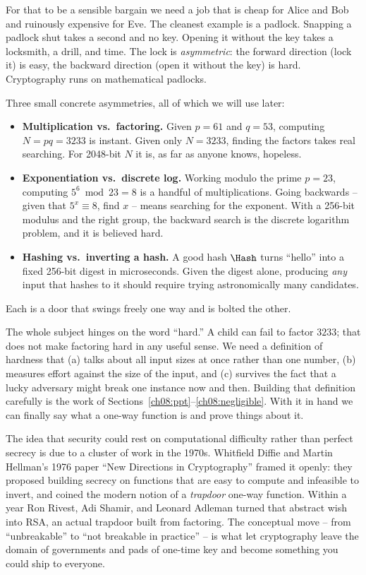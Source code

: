 For that to be a sensible bargain we need a job that is cheap for Alice and Bob and ruinously expensive for Eve. The cleanest example is a padlock. Snapping a padlock shut takes a second and no key. Opening it without the key takes a locksmith, a drill, and time. The lock is \emph{asymmetric}: the forward direction (lock it) is easy, the backward direction (open it without the key) is hard. Cryptography runs on mathematical padlocks.

\begin{intuitionbox}
Three small concrete asymmetries, all of which we will use later:
\begin{itemize}
\item \textbf{Multiplication vs.\ factoring.} Given $p=61$ and $q=53$, computing $N = pq = 3233$ is instant. Given only $N=3233$, finding the factors takes real searching. For 2048-bit $N$ it is, as far as anyone knows, hopeless.
\item \textbf{Exponentiation vs.\ discrete log.} Working modulo the prime $p=23$, computing $5^{6} \bmod 23 = 8$ is a handful of multiplications. Going backwards -- given that $5^{x}\equiv 8$, find $x$ -- means searching for the exponent. With a 256-bit modulus and the right group, the backward search is the discrete logarithm problem, and it is believed hard.
\item \textbf{Hashing vs.\ inverting a hash.} A good hash $\Hash$ turns ``hello'' into a fixed 256-bit digest in microseconds. Given the digest alone, producing \emph{any} input that hashes to it should require trying astronomically many candidates.
\end{itemize}
Each is a door that swings freely one way and is bolted the other.
\end{intuitionbox}

The whole subject hinges on the word ``hard.'' A child can fail to factor $3233$; that does not make factoring hard in any useful sense. We need a definition of hardness that (a) talks about all input sizes at once rather than one number, (b) measures effort against the size of the input, and (c) survives the fact that a lucky adversary might break one instance now and then. Building that definition carefully is the work of Sections~\ref{ch08:ppt}--\ref{ch08:negligible}. With it in hand we can finally say what a one-way function is and prove things about it.

\begin{historybox}
The idea that security could rest on computational difficulty rather than perfect secrecy is due to a cluster of work in the 1970s. Whitfield Diffie and Martin Hellman's 1976 paper ``New Directions in Cryptography'' framed it openly: they proposed building secrecy on functions that are easy to compute and infeasible to invert, and coined the modern notion of a \emph{trapdoor} one-way function. Within a year Ron Rivest, Adi Shamir, and Leonard Adleman turned that abstract wish into RSA, an actual trapdoor built from factoring. The conceptual move -- from ``unbreakable'' to ``not breakable in practice'' -- is what let cryptography leave the domain of governments and pads of one-time key and become something you could ship to everyone.
\end{historybox}

